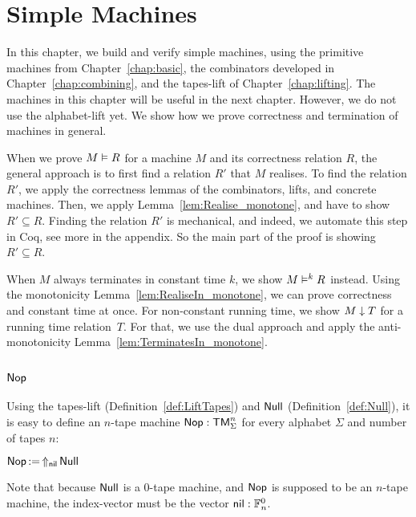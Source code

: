\chapter{Simple Machines}
\label{chap:compound}

In this chapter, we build and verify simple machines, using the primitive machines from Chapter~\ref{chap:basic}, the combinators developed in
Chapter~\ref{chap:combining}, and the tapes-lift of Chapter~\ref{chap:lifting}.  The machines in this chapter will be useful in the next chapter.
However, we do not use the alphabet-lift yet.  We show how we prove correctness and termination of machines in general.

When we prove $M \mathrel{\vDash} R$ for a machine $M$ and its correctness relation $R$, the general approach is to first find a relation $R'$ that $M$
realises.  To find the relation $R'$, we apply the correctness lemmas of the combinators, lifts, and concrete machines.  Then, we apply
Lemma~\ref{lem:Realise_monotone}, and have to show $R' \subseteq R$.  Finding the relation $R'$ is mechanical, and indeed, we automate this step in
Coq, see more in the appendix.  So the main part of the proof is showing $R' \subseteq R$.

When $M$ always terminates in constant time $k$, we show $M \mathrel{\vDash^{k}} R$ instead.  Using the monotonicity Lemma~\ref{lem:RealiseIn_monotone}, we
can prove correctness and constant time at once.  For non-constant running time, we show $M \mathrel{\downarrow} T$ for a running time relation~$T$.  For
that, we use the dual approach and apply the anti-monotonicity Lemma~\ref{lem:TerminatesIn_monotone}.


\section{$\Nop$}
\label{sec:Nop}
%


Using the tapes-lift (Definition~\ref{def:LiftTapes}) and $\mathsf{Null}$ (Definition~\ref{def:Null}), it is easy to define an $n$-tape machine
$\mathsf{Nop} : \mathsf{TM}_\Sigma^n$ for every alphabet $\Sigma$ and number of tapes $n$:
\begin{definition}[$\Nop$][Nop]
  $\mathsf{Nop} \mathop{:=} \mathop{\Uparrow_{\mathsf{nil}}} \mathsf{Null}$
\end{definition}
Note that because $\mathsf{Null}$ is a 0-tape machine, and $\Nop$ is supposed to be an $n$-tape machine, the index-vector must be the vector
$\mathsf{nil} : \mathbb{F}_n^0$.


